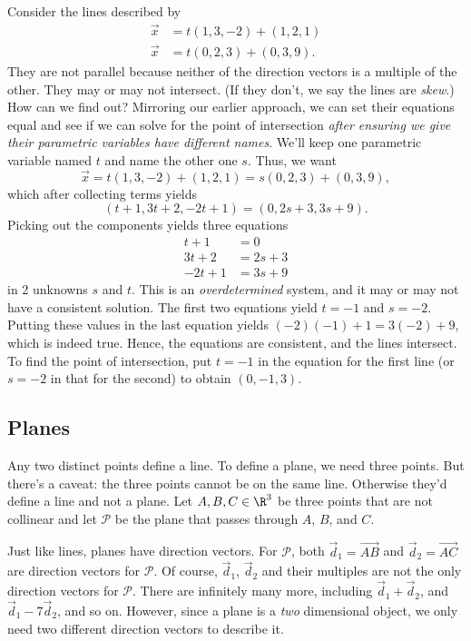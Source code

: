 \begin{example}
Consider the lines described by
\begin{align*}
	\vec x &= t(1, 3, -2 ) + ( 1, 2, 1 ) \\
	\vec x &= t( 0, 2, 3) + ( 0, 3, 9 ).
\end{align*}
They are not parallel because neither of the direction
vectors is a multiple
of the other.  They may or may not intersect.  (If they don't,
	we say the lines are \emph{skew}.)  How can we find out?  
	Mirroring our earlier approach, 
	we can set their equations equal and see if we can solve for the point
	of intersection \emph{after ensuring we give their parametric variables
	have
	different names}.   We'll keep one parametric variable named $t$ and name the
	other one $s$.  Thus, we want
\[
\vec x = t( 1, 3, -2 ) + ( 1, 2, 1 ) =
s( 0, 2, 3) + ( 0, 3, 9 ),
\]
which after collecting terms yields
\[
    ( t + 1, 3t + 2, -2t + 1 ) = ( 0, 2s + 3, 3s + 9).
\]
Picking out the components yields three equations
\begin{align*}
    t + 1 &= 0 \\
    3t +2 &= 2s + 3 \\
    -2t + 1 &=  3s + 9
\end{align*}
in 2 unknowns  $s$ and $t$.  This is an {\it overdetermined\/}
system, and it may or may not have a consistent solution.  
The first two equations yield $t = -1$  and $s = -2$.  Putting
these values in the last equation yields $(-2)(-1) + 1 = 3(-2) + 9$,
which is indeed true.
Hence, the equations are consistent, and the lines
intersect.   To find the point of intersection, put $t = -1$
in the equation for the first line (or
$s = -2$ in that for the second) to obtain  $( 0, -1, 3 )$.  
\end{example}

\subsection{Planes}

Any two distinct points define a line.  To define a plane, we
need three points.  But there's a caveat: the three points cannot
be on the same line. Otherwise they'd define a line
and not a plane.  Let $A,B,C\in\R^3$ be three points that are not
collinear and let $\mathcal P$ be the plane that passes through $A$,
$B$, and $C$.

Just like lines, planes have direction vectors.  For $\mathcal P$, both
$\vec d_1=\overrightarrow{AB}$ and $\vec d_2=\overrightarrow{AC}$ are direction
vectors for $\mathcal P$.  Of course, $\vec d_1$, $\vec d_2$ and their multiples
are not the only direction vectors for $\mathcal P$. There are infinitely many more, including
$\vec d_1+\vec d_2$, and $\vec d_1-7\vec d_2$, and so on.  However, since a plane
is a \emph{two} dimensional object, we only need two different direction vectors to describe it.

